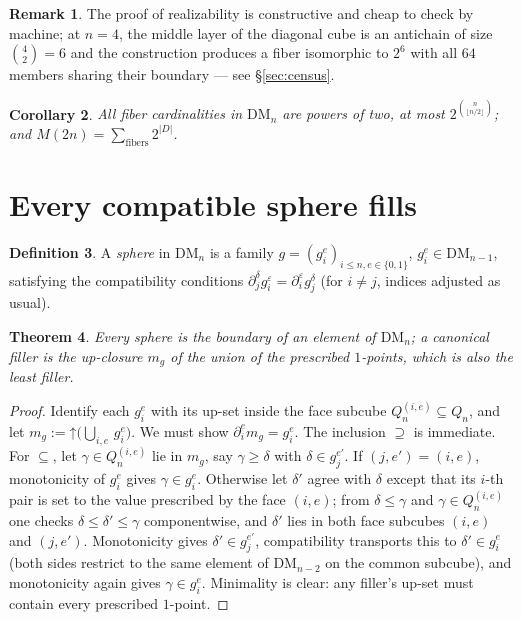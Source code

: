 \documentclass[11pt]{amsart}
\newtheorem{thm}{Theorem}[section]
\newtheorem{cor}[thm]{Corollary}
\theoremstyle{definition}
\newtheorem{defi}[thm]{Definition}
\newtheorem{rem}[thm]{Remark}
\newcommand{\DM}{\mathrm{DM}}
\newcommand{\lc}{Q}                       %
\newcommand{\bnd}{\partial}
\newcommand{\Up}{\mathord{\uparrow}}
\begin{document}
\begin{rem}
  The proof of realizability is constructive and cheap to check by
  machine; at $n = 4$, the middle layer of the diagonal cube is an
  antichain of size $\binom{4}{2} = 6$ and the construction produces
  a fiber isomorphic to $2^6$ with all $64$ members sharing their
  boundary --- see \S\ref{sec:census}.
\end{rem}

\begin{cor}
  \label{cor:powers}
  All fiber cardinalities in $\DM_n$ are powers of two, at most
  $2^{\binom{n}{\lfloor n/2\rfloor}}$; and
  $M(2n) = \sum_{\text{fibers}} 2^{|D|}$.
\end{cor}

\section{Every compatible sphere fills}
\label{sec:filling}

\begin{defi}
  A \emph{sphere} in $\DM_n$ is a family
  $g = (g_i^e)_{i \le n, e \in \{0,1\}}$, $g_i^e \in \DM_{n-1}$,
  satisfying the compatibility conditions
  $\bnd_j^\delta g_i^\varepsilon = \bnd_i^\varepsilon g_j^\delta$
  (for $i \neq j$, indices adjusted as usual).
\end{defi}

\begin{thm}
  \label{thm:filling}
  Every sphere is the boundary of an element of $\DM_n$; a canonical
  filler is the up-closure $m_g$ of the union of the prescribed
  $1$-points, which is also the least filler.
\end{thm}

\begin{proof}
  Identify each $g_i^e$ with its up-set inside the face subcube
  $\lc_n^{(i,e)} \subseteq \lc_n$, and let
  $m_g := \Up \bigl(\bigcup_{i,e}\, g_i^e\bigr)$.  We must show
  $\bnd_i^e m_g = g_i^e$.  The inclusion $\supseteq$ is immediate.
  For $\subseteq$, let $\gamma \in \lc_n^{(i,e)}$ lie in $m_g$, say
  $\gamma \ge \delta$ with $\delta \in g_j^{e'}$.  If $(j,e') =
  (i,e)$, monotonicity of $g_i^e$ gives $\gamma \in g_i^e$.
  Otherwise let $\delta'$ agree with $\delta$ except that its $i$-th
  pair is set to the value prescribed by the face $(i,e)$; from
  $\delta \le \gamma$ and $\gamma \in \lc_n^{(i,e)}$ one checks
  $\delta \le \delta' \le \gamma$ componentwise, and $\delta'$ lies
  in both face subcubes $(i,e)$ and $(j,e')$.  Monotonicity gives
  $\delta' \in g_j^{e'}$, compatibility transports this to
  $\delta' \in g_i^e$ (both sides restrict to the same element of
  $\DM_{n-2}$ on the common subcube), and monotonicity again gives
  $\gamma \in g_i^e$.  Minimality is clear: any filler's up-set must
  contain every prescribed $1$-point.
\end{proof}
\end{document}
